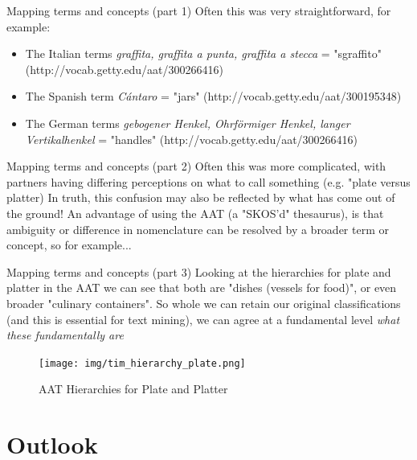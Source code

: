\documentclass[xcolor=x11names, aspectratio=169,usenames,dvipsnames]{beamer}
\begin{document}
\begin{frame}{Mapping terms and concepts (part 1)}
Often this was very straightforward, for example:
\begin{itemize}
\item The Italian terms \emph{graffita, graffita a punta, graffita a stecca} = "sgraffito" (http://vocab.getty.edu/aat/300266416)
\item The Spanish term \emph{Cántaro} = "jars" (http://vocab.getty.edu/aat/300195348)
\item The German terms \emph{gebogener Henkel, Ohrförmiger Henkel, langer Vertikalhenkel} = "handles" (http://vocab.getty.edu/aat/300266416)
\end{itemize}
\end{frame}

\begin{frame}{Mapping terms and concepts (part 2)}
Often this was more complicated, with  partners having differing perceptions on what to call something (e.g. "plate versus platter)\newline
\newline
In truth, this confusion may also be reflected by what has come out of the ground!\newline
\newline
An advantage of using the AAT (a "SKOS'd" thesaurus), is that ambiguity or difference in nomenclature can be resolved by  a broader term or concept, so for example...
\end{frame}

\begin{frame}{Mapping terms and concepts (part 3)}
Looking at the hierarchies for plate and platter in the AAT we can see that both are "dishes (vessels for food)", or even broader "culinary containers". So whole we can retain our original classifications (and this is essential for text mining), we can agree at a fundamental level \emph{what these fundamentally are}
\begin{center}
\begin{figure}
\texttt{[image: img/tim\_hierarchy\_plate.png]}
\caption{AAT Hierarchies for Plate and Platter}
\end{figure}
\end{center}
\end{frame}

\section{Outlook}
\end{document}

